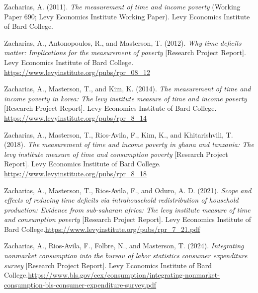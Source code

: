 \documentclass[
  11pt,
]{article}
\newlength{\cslhangindent}
\newenvironment{CSLReferences}[2] %
 {\begin{list}{}{%
  \setlength{\itemindent}{0pt}
  \setlength{\leftmargin}{0pt}
  \setlength{\parsep}{0pt}
  \ifodd #1
   \setlength{\leftmargin}{\cslhangindent}
   \setlength{\itemindent}{-1\cslhangindent}
  \fi
  \setlength{\itemsep}{#2\baselineskip}}}
 {\end{list}}
\begin{document}
\begin{CSLReferences}{1}{0}
Zacharias, A. (2011). \emph{The measurement of time and income poverty}
(Working Paper 690; Levy Economics Institute Working Paper). Levy
Economics Institute of Bard College.

Zacharias, A., Antonopoulos, R., and Masterson, T. (2012). \emph{Why
time deficits matter: Implications for the measurement of poverty}
{[}Research Project Report{]}. Levy Economics Institute of Bard College.
\url{https://www.levyinstitute.org/pubs/rpr_08_12}

Zacharias, A., Masterson, T., and Kim, K. (2014). \emph{The measurement
of time and income poverty in korea: The levy institute measure of time
and income poverty} {[}Research Project Report{]}. Levy Economics
Institute of Bard College.
\url{https://www.levyinstitute.org/pubs/rpr_8_14}

Zacharias, A., Masterson, T., Rios-Avila, F., Kim, K., and
Khitarishvili, T. (2018). \emph{The measurement of time and income
poverty in ghana and tanzania: The levy institute measure of time and
consumption poverty} {[}Research Project Report{]}. Levy Economics
Institute of Bard College.
\url{https://www.levyinstitute.org/pubs/rpr_8_18}

Zacharias, A., Masterson, T., Rios-Avila, F., and Oduro, A. D. (2021).
\emph{Scope and effects of reducing time deficits via intrahousehold
redistribution of household production: Evidence from sub-saharan
africa: The levy institute measure of time and consumption poverty}
{[}Research Project Report{]}. Levy Economics Institute of Bard
College.\href{\%20https://www.levyinstitute.org/pubs/rpr_7_21.pdf}{https://www.levyinstitute.org/pubs/rpr\_7\_21.pdf}

Zacharias, A., Rios-Avila, F., Folbre, N., and Masterson, T. (2024).
\emph{Integrating nonmarket consumption into the bureau of labor
statistics consumer expenditure survey} {[}Research Project Report{]}.
Levy Economics Institute of Bard
College.\href{\%20https://www.bls.gov/cex/consumption/integrating-nonmarket-consumption-bls-consumer-expenditure-survey.pdf}{https://www.bls.gov/cex/consumption/integrating-nonmarket-consumption-bls-consumer-expenditure-survey.pdf}

\end{CSLReferences}
\end{document}
